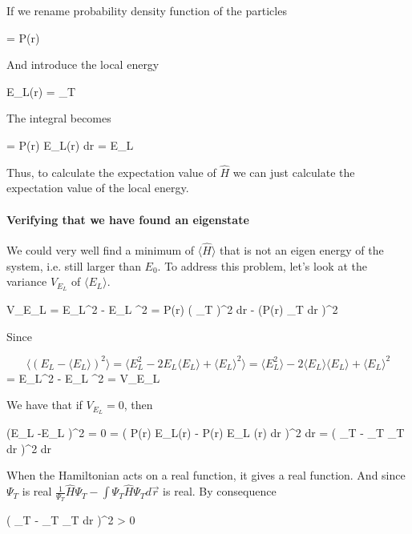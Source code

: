 If we rename probability density function of the particles 

\eqs 
{} = P(\vec r)
\eqf

And introduce the local energy 

\eqs
E_L(\vec r) =   \Psi_T
\eqf

The integral becomes 

\eqs
\langle {} \rangle = \int P(\vec r) E_L(\vec r) d\vec r = \langle E_L \rangle
\eqf

Thus, to calculate the expectation value of $\hat{H}$ we can just calculate the expectation value of the local energy.



\paragraph{Verifying that we have found an eigenstate}

We could very well find a minimum of $\langle \hat{H} \rangle$ that is not an eigen energy of the system, i.e. still larger than $E_0$.
To address this problem, let's look at the variance $V_{E_L}$ of $\langle E_L \rangle$. 

\eqs
V_{E_L} = \langle E_L^2 \rangle - \langle E_L \rangle^2
= 
\int P(\vec r) \left (  \Psi_T \right )^2 d\vec r -
\left (\int P(\vec r)   \Psi_T d\vec r \right )^2
\eqf 

Since

\[
\langle (E_L -\langle E_L \rangle)^2 \rangle = \langle E_L^2 - 2 E_L \langle E_L \rangle + \langle E_L \rangle^2 \rangle 
=  
\langle E_L^2 \rangle - 2 \langle E_L \rangle \langle E_L \rangle + \langle E_L \rangle^2
\]
\eqs
= \langle E_L^2 \rangle - \langle E_L \rangle^2 
=
V_{E_L}
\eqf

We have that if $V_{E_L} = 0$, then 

\eqs
\langle (E_L -\langle E_L \rangle)^2 \rangle = 0
\eqf
{} = \int  \left (  P(\vec r) E_L(\vec r) -  \int P(\vec r) E_L (\vec r) d\vec r \right )^2 d\vec r = 
\int \left (
  \Psi_T  - \int \Psi_T  \Psi_T d\vec r 
\right )^2 d\vec r
\label{eq:Variance0_1}
\eqf

When the Hamiltonian acts on a real function, it gives a real function. 
And since $\Psi_T$ is real $\frac{1}{\Psi_T} \hat{H} \Psi_T  - \int \Psi_T \hat{H} \Psi_T d\vec r$ is real. 
By consequence

\eqs 
\left (
  \Psi_T  - \int \Psi_T  \Psi_T d\vec r 
\right )^2 > 0
\eqf

